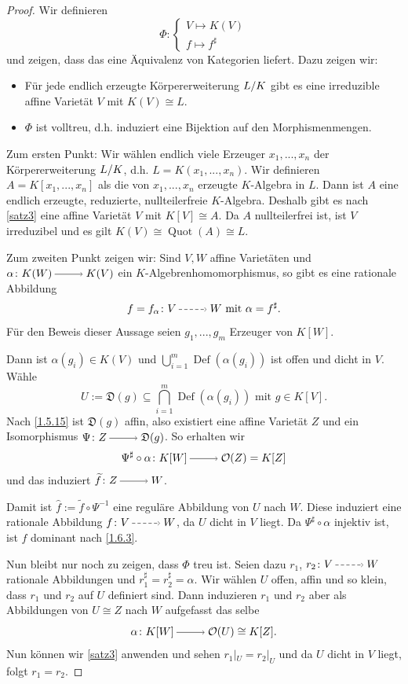 \documentclass[a4paper,12pt,index=toc]{scrbook}
\theoremstyle{keinenummern} %
\def\O{\mathcal{O}}
\newcommand{\D}{\mathfrak{D}}
\newcommand{\Def}{\operatorname{Def}}
\newcommand{\Quot}{\operatorname{Quot}}
\newcommand{\restrict}[1]{|_{#1}}
\renewcommand{\dotsc}{\ensuremath{\!...}}
\newcommand{\schlange}[1]{\widetilde{#1}}
\newcommand{\dach}{\widehat}
\begin{document}
\begin{proof} Wir definieren
\[\Phi\colon\begin{cases}V\mapsto K(V)\\f\mapsto f^{\sharp}\end{cases}\]
und zeigen, dass das eine Äquivalenz von Kategorien liefert. Dazu zeigen wir: 
  \begin{itemize}
  \item Für jede endlich erzeugte Körpererweiterung $\Quotient{L}{K}$ gibt es eine irreduzible affine Varietät $V$ mit $K(V)\cong L$.
  \item $\Phi$ ist volltreu, d.h. induziert eine Bijektion auf den Morphismenmengen.
  \end{itemize}
Zum ersten Punkt: Wir wählen endlich viele Erzeuger $x_1,\dotsc,x_n$ der Körpererweiterung $\Quotient{L}{K}$, d.h. $L=K(x_1,\dotsc,x_n)$. Wir definieren $A=K[x_1,\dotsc,x_n]$ als die von $x_1,\dotsc,x_n$ erzeugte $K$-Algebra in $L$. Dann ist $A$ eine endlich erzeugte, reduzierte, nullteilerfreie
$K$-Algebra. Deshalb gibt es nach \cref{satz3} eine affine Varietät $V$ mit $K[V]\cong A$. Da $A$ nullteilerfrei ist, ist $V$ irreduzibel und es gilt $K(V)\cong \Quot(A)\cong L$.

Zum zweiten Punkt zeigen wir: Sind $V,W$ affine Varietäten und $\alpha \colon K(W)\ra K(V)$ ein $K$-Algebrenhomomorphismus, so gibt es eine rationale Abbildung \[f=f_{\alpha}\colon V\ppf W\text{ mit }\alpha=f^{\sharp}.\]
%
Für den Beweis dieser Aussage seien $g_1,\dotsc,g_m$ Erzeuger von $K[W]$. 

Dann ist $\alpha(g_i)\in K(V)$ und $\bigcup_{i=1}^{m} \Def(\alpha(g_i))$ ist offen und dicht in $V$. Wähle 
\[U:=\D(g)\subseteq \bigcap_{i=1}^{m} \Def(\alpha(g_i))\text{ mit }g \in K[V].\]
Nach \cref{1.5.15} ist  $\D(g)$ affin, also existiert eine affine Varietät $Z$ und ein Isomorphismus $\Psi \colon Z\ra \D(g)$.
So erhalten wir
\[\Psi^{\sharp}\circ \alpha \colon K[W] \ra \O(Z)=K[Z]\]
und das induziert $\schlange{f} \colon Z\ra W$.

Damit ist $\dach{f}:=\schlange{f}\circ \Psi^{-1}$ eine reguläre Abbildung von $U$ nach $W$. Diese induziert eine rationale Abbildung $f \colon V\ppf W$, da $U$ dicht in $V$ liegt. Da $\Psi^{\sharp}\circ \alpha$ injektiv ist, ist $f$ dominant nach \cref{1.6.3}.

Nun bleibt nur noch zu zeigen, dass $\Phi$ treu ist. Seien dazu $r_1$, $r_2 \colon V\ppf W$ rationale Abbildungen und $r_1^{\sharp}=r_2^{\sharp}=\alpha$. Wir wählen $U$ offen, affin und so klein, dass $r_1$ und $r_2$ auf $U$ definiert sind.
Dann induzieren $r_1$ und $r_2$ aber als Abbildungen von $U\cong Z$ nach $W$ aufgefasst das selbe 
\[\alpha \colon K[W] \ra \O(U)\cong K[Z].\] 
Nun können wir \cref{satz3} anwenden und sehen $r_1\restrict{U}=r_2\restrict{U}$ und da $U$ dicht in $V$ liegt, folgt $r_1=r_2$.
\end{proof}
\end{document}
